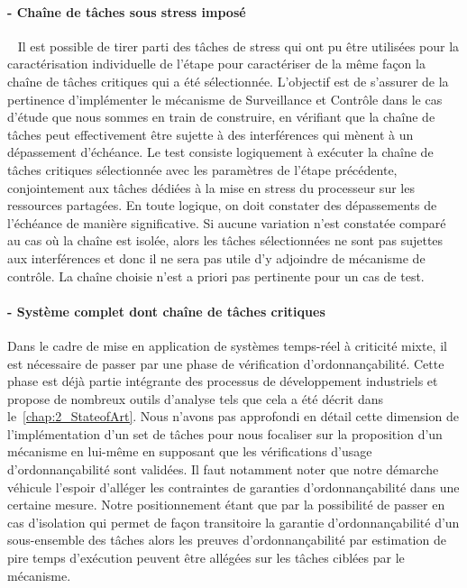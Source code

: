 \documentclass[french, a4paper, 11pt, twoside, pdftex]{StyleThese}
\begin{document}
		\paragraph{ - Chaîne de tâches sous stress imposé}~\label{sec:pertinenceMecanisme}
		Il est possible de tirer parti des tâches de stress qui ont pu être utilisées pour la caractérisation individuelle de l'étape  pour caractériser de la même façon la chaîne de tâches critiques qui a été sélectionnée. L'objectif est de s'assurer de la pertinence d'implémenter le mécanisme de Surveillance et Contrôle dans le cas d'étude que nous sommes en train de construire, en vérifiant que la chaîne de tâches peut effectivement être sujette à des interférences qui mènent à un dépassement d'échéance. 
		Le test consiste logiquement à exécuter la chaîne de tâches critiques sélectionnée avec les paramètres de l'étape précédente, conjointement aux tâches dédiées à la mise en stress du processeur sur les ressources partagées. En toute logique, on doit constater des dépassements de l'échéance de manière significative. Si aucune variation n'est constatée comparé au cas où la chaîne est isolée, alors les tâches sélectionnées ne sont pas sujettes aux interférences et donc il ne sera pas utile d'y adjoindre de mécanisme de contrôle. La chaîne choisie n'est a priori pas pertinente pour un cas de test.

		\paragraph{ - Système complet dont chaîne de tâches critiques}
		Dans le cadre de mise en application de systèmes temps-réel à criticité mixte, il est nécessaire de passer par une phase de vérification d'ordonnançabilité. Cette phase est déjà partie intégrante des processus de développement industriels et propose de nombreux outils d'analyse tels que cela a été décrit dans le~\autoref{chap:2_StateofArt}. Nous n'avons pas approfondi en détail cette dimension de l'implémentation d'un set de tâches pour nous focaliser sur la proposition d'un mécanisme en lui-même en supposant que les vérifications d'usage d'ordonnançabilité sont validées. Il faut notamment noter que notre démarche véhicule l'espoir d'alléger les contraintes de garanties d'ordonnançabilité dans une certaine mesure. Notre positionnement étant que par la possibilité de passer en cas d'isolation qui permet de façon transitoire la garantie d'ordonnançabilité d'un sous-ensemble des tâches alors les preuves d'ordonnançabilité par estimation de pire temps d'exécution peuvent être allégées sur les tâches ciblées par le mécanisme.
		
\end{document}
